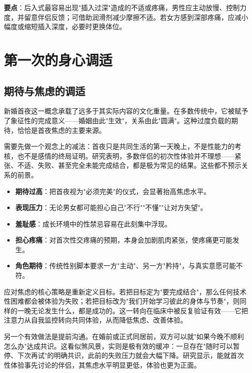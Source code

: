 \documentclass[12pt,UTF8]{ctexbook}
\newcommand{\keyword}[1]{\textbf{#1}}
\begin{document}
\noindent\textbf{要点}：后入式最容易出现"插入过深"造成的不适或疼痛，男性应主动放慢、控制力度，并留意伴侣反馈；可借助润滑剂减少摩擦不适。若女方感到深部疼痛，应减小幅度或缩短插入深度，必要时更换体位。

\vspace{0.5em}

\section{第一次的身心调适}
\subsection{期待与焦虑的调适}

新婚首夜这一概念承载了远多于其实际内容的文化重量。在多数传统中，它被赋予了象征性的完成意义——婚姻由此"生效"，关系由此"圆满"。这种过度负载的期待，恰恰是首夜焦虑的主要来源。

需要先做一个观念上的减法：首夜只是共同生活的第一天晚上，不是性能力的考核，也不是感情的终局证明。研究表明，多数伴侣的初次性体验并不理想——紧张、不适、失败、甚至完全未能完成结合，都是极为常见的结果。这些都不预示关系的前景。

\begin{itemize}
	\item \keyword{期待过高}：把首夜视为"必须完美"的仪式，会显著抬高焦虑水平。
	\item \keyword{表现压力}：无论男女都可能担心自己"不行""不懂""让对方失望"。
	\item \keyword{羞耻感}：成长环境中的性禁忌容易在此刻集中浮现。
	\item \keyword{担心疼痛}：对首次性交疼痛的预期，本身会加剧肌肉紧张，使疼痛更可能发生。
	\item \keyword{角色期待}：传统性别脚本要求一方"主动"、另一方"矜持"，与真实意愿可能不符。
\end{itemize}

应对焦虑的核心策略是重新定义目标。若把目标定为"要完成结合"，那么任何技术性困难都会被体验为失败；若把目标改为"我们开始学习彼此的身体与节奏"，则同样的一晚无论发生什么，都是成功的。这一转向在临床中被反复验证有效——它把注意力从自我监控转向共同体验，从而降低焦虑、改善体验。

另一个有效做法是提前沟通。在婚前或正式同居前，双方可以就"如果今晚不顺利怎么办"达成共识。这看似煞风景，实则是极有效的缓冲：一旦存在"随时可以暂停、下次再试"的明确共识，此前的失败压力就会大幅下降。研究显示，能就首次性体验事先讨论的伴侣，其焦虑水平明显更低，体验也更为正面。
\end{document}
